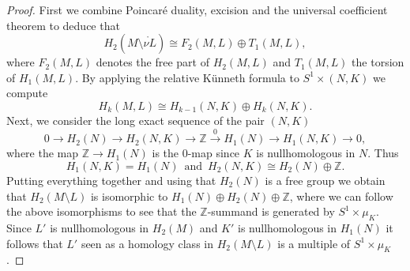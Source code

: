 \documentclass[10pt,a4paper]{amsart}
\newcommand{\Z}{\mathbb{Z}}
\begin{document}
\begin{proof}
First we combine Poincar\'e duality, excision and the universal coefficient theorem to deduce that
\begin{equation*}
H_2(M\setminus \mathring{\nu L})\cong F_2(M,L)\oplus T_1(M,L),
\end{equation*}
where $F_2(M,L)$ denotes the free part of $H_2(M,L)$ and $T_1(M,L)$ the torsion of $H_1(M,L)$. By applying the relative K\"unneth formula to $S^1\times (N,K)$ we compute
\begin{equation*}
H_k(M,L)\cong H_{k-1}(N,K)\oplus H_k(N,K).
\end{equation*}
Next, we consider the long exact sequence of the pair $(N,K)$
\begin{equation*}
0\longrightarrow H_2(N)\longrightarrow H_2(N,K)\longrightarrow \Z\overset{0}{\longrightarrow} H_1(N)\longrightarrow H_1(N,K)\longrightarrow 0,
\end{equation*}
where the map $\Z\rightarrow H_1(N)$ is the $0$-map since $K$ is nullhomologous in $N$. Thus 
\begin{equation*}
H_1(N,K)=H_1(N)\,\text{ and }\, H_2(N,K)\cong H_2(N)\oplus\Z.
\end{equation*}
Putting everything together and using that $H_2(N)$ is a free group we obtain that $H_2(M\setminus L)$ is isomorphic to $H_1(N)\oplus H_2(N)\oplus \Z$, where we can follow the above isomorphisms to see that the $\Z$-summand is generated by $S^1\times \mu_K$.
Since $L'$ is nullhomologous in $H_2(M)$ and $K'$ is nullhomologous in $H_1(N)$ it follows that $L'$ seen as a homology class in $H_2(M\setminus L)$ is a multiple of $S^1\times \mu_K$.
\end{proof}
\end{document}
